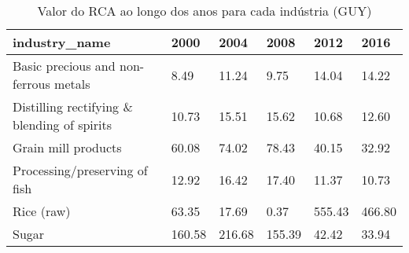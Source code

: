 \begin{table}
\centering
\caption{Valor do RCA ao longo dos anos para cada indústria (GUY)}
\begin{tabular}{p{6cm}p{1.5cm}p{1.5cm}p{1.5cm}p{1.5cm}p{1.5cm}}
\toprule
                              industry\_name &   2000 &   2004 &   2008 &   2012 &   2016 \\
\midrule
      Basic precious and non-ferrous metals &   8.49 &  11.24 &   9.75 &  14.04 &  14.22 \\
Distilling rectifying \& blending of spirits &  10.73 &  15.51 &  15.62 &  10.68 &  12.60 \\
                        Grain mill products &  60.08 &  74.02 &  78.43 &  40.15 &  32.92 \\
              Processing/preserving of fish &  12.92 &  16.42 &  17.40 &  11.37 &  10.73 \\
                                 Rice (raw) &  63.35 &  17.69 &   0.37 & 555.43 & 466.80 \\
                                      Sugar & 160.58 & 216.68 & 155.39 &  42.42 &  33.94 \\
\bottomrule
\end{tabular}
\end{table}
